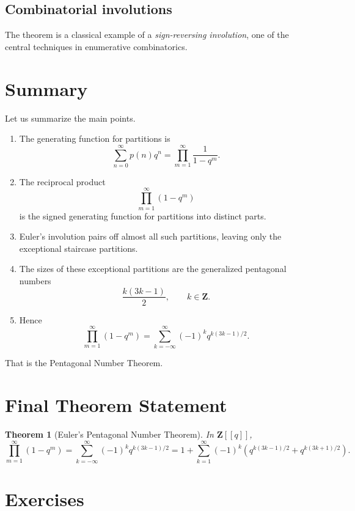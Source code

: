 \documentclass[11pt]{article}
\newtheorem{theorem}{Theorem}[section]
\theoremstyle{definition}
\theoremstyle{remark}
\newcommand{\ZZ}{\mathbf{Z}}
\begin{document}
	\subsection{Combinatorial involutions}
	
	The theorem is a classical example of a \emph{sign-reversing involution}, one of the central techniques in enumerative combinatorics.
	
	\section{Summary}
	
	Let us summarize the main points.
	
	\begin{enumerate}[label=\arabic*.]
		\item The generating function for partitions is
		\[
		\sum_{n=0}^{\infty}p(n)q^n
		=
		\prod_{m=1}^{\infty}\frac{1}{1-q^m}.
		\]
		\item The reciprocal product
		\[
		\prod_{m=1}^{\infty}(1-q^m)
		\]
		is the signed generating function for partitions into distinct parts.
		\item Euler's involution pairs off almost all such partitions, leaving only the exceptional staircase partitions.
		\item The sizes of these exceptional partitions are the generalized pentagonal numbers
		\[
		\frac{k(3k-1)}{2},\qquad k\in \ZZ.
		\]
		\item Hence
		\[
		\prod_{m=1}^{\infty}(1-q^m)
		=
		\sum_{k=-\infty}^{\infty}(-1)^k q^{k(3k-1)/2}.
		\]
	\end{enumerate}
	
	That is the Pentagonal Number Theorem.
	
	\section{Final Theorem Statement}
	
	\begin{theorem}[Euler's Pentagonal Number Theorem]
		In \(\ZZ[[q]]\),
		\[
		\prod_{m=1}^{\infty}(1-q^m)
		=
		\sum_{k=-\infty}^{\infty}(-1)^k q^{k(3k-1)/2}
		=
		1+\sum_{k=1}^{\infty}(-1)^k
		\left(q^{k(3k-1)/2}+q^{k(3k+1)/2}\right).
		\]
	\end{theorem}
	
	\section{Exercises}
	
\end{document}
